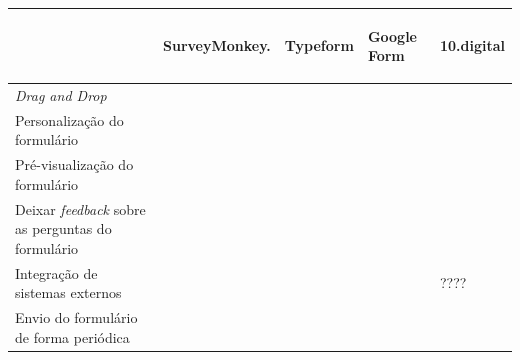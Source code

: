 \newpage
		

		\renewcommand{\arraystretch}{2.5}
		\setlength\arrayrulewidth{1.5pt}
	\begin{table}[!ht]  
		\begin{center}
		\begin{tabular}{|p{4cm}|p{1.5cm}|p{1.5cm}|p{1.5cm}|p{1.5cm}|}
			\cline{2-5}
			\multicolumn{1}{c|}{} & \hspace{0.6cm}\begin{sideways}SurveyMonkey.\end{sideways} & \hspace{0.6cm}\begin{sideways}Typeform\end{sideways} & \hspace{0.6cm}\begin{sideways}Google Form\end{sideways} &\hspace{0.6cm}\begin{sideways} 10.digital\end{sideways}\\ \hline
			
		
				\textit{Drag and Drop} & \cellcolor{green!80}   & \cellcolor{red!80}  & \cellcolor{red!80} & \cellcolor{red!80} \\ \hline
				
			Personalização do formulário& \cellcolor{green!80}    & \cellcolor{green!80}   & \cellcolor{yellow!80} & \cellcolor{green!80}   \\ \hline
			
			 Pré-visualização do formulário& \cellcolor{green!80}  & \cellcolor{green!80}  & \cellcolor{green!80} & \cellcolor{green!80} \\ \hline
			 
			 	Deixar \textit{feedback} sobre as perguntas do formulário& \cellcolor{red!80}    & \cellcolor{red!80}   & \cellcolor{red!80} & \cellcolor{green!80}   \\ \hline
			
			 Integração de sistemas externos& \cellcolor{red!80}   & \cellcolor{green!80} & \cellcolor{yellow!80}  & ????  \\ \hline
			
			Envio do formulário de forma periódica & \cellcolor{red!80}   & \cellcolor{red!80}  & \cellcolor{red!80} & \cellcolor{green!80} \\ \hline
			

\end{tabular}
\end{center}
\end{table}
